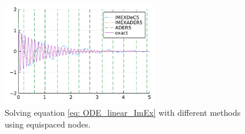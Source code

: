 \begin{figure}
	\centering
	\includegraphics[width=0.6\textwidth]{pdf/odepics/Num_val/exa_ImEx_linear.pdf}
	\caption{Solving equation \eqref{eq: ODE_linear_ImEx} with different methods using equispaced nodes.}
	\label{fig: exaImEx_linear}
\end{figure}

